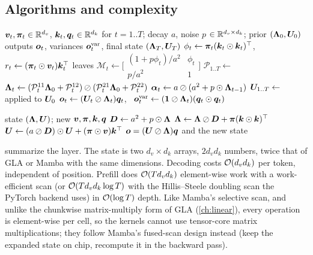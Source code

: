 \subsection{Algorithms and complexity}

\begin{algorithm}[t]
\caption{KLA prefill / training (parallel)}\label{alg:c08-kla-prefill}
\begin{algorithmic}[1]
\Require $\bm{v}_t,\bm{\pi}_t\in\mathbb{R}^{d_v}$, $\bm{k}_t,\bm{q}_t\in\mathbb{R}^{d_k}$ for $t=1..T$; decay $a$, noise $p$
  $\in\mathbb{R}^{d_v\times d_k}$; prior $(\bm{\Lambda}_0,\bm{U}_0)$
\Ensure outputs $\bm{o}_t$, variances $\bm{o}^{\mathrm{var}}_t$, final state $(\bm{\Lambda}_T,\bm{U}_T)$
\State $\phi_t\gets\bm{\pi}_t(\bm{k}_t\odot\bm{k}_t)^{\top}$, \ $r_t\gets(\bm{\pi}_t\odot\bm{v}_t)\bm{k}_t^{\top}$ 
\State leaves $\mathcal{M}_t\gets\bigl[\begin{smallmatrix}(1+p\phi_t)/a^2&\phi_t\\p/a^2&1\end{smallmatrix}\bigr]$
\State $\mathcal{P}_{1..T}\gets$ 
\State $\bm{\Lambda}_t\gets(\mathcal{P}^{11}_t\bm{\Lambda}_0+\mathcal{P}^{12}_t)\oslash(\mathcal{P}^{21}_t\bm{\Lambda}_0+\mathcal{P}^{22}_t)$
\State $\bm{\alpha}_t\gets a\oslash(a^2+p\odot\bm{\Lambda}_{t-1})$ 
\State $\bm{U}_{1..T}\gets$  applied to $\bm{U}_0$
\State $\bm{o}_t\gets(\bm{U}_t\oslash\bm{\Lambda}_t)\bm{q}_t$, \ $\bm{o}^{\mathrm{var}}_t\gets(\bm{1}\oslash\bm{\Lambda}_t)(\bm{q}_t\odot\bm{q}_t)$
\end{algorithmic}
\end{algorithm}

\begin{algorithm}[t]
\caption{KLA decode (one token)}\label{alg:c08-kla-decode}
\begin{algorithmic}[1]
\Require state $(\bm{\Lambda},\bm{U})$; new $\bm{v},\bm{\pi},\bm{k},\bm{q}$
\State $\bm{D}\gets a^2+p\odot\bm{\Lambda}$
\State $\bm{\Lambda}\gets\bm{\Lambda}\oslash\bm{D}+\bm{\pi}(\bm{k}\odot\bm{k})^{\top}$
\State $\bm{U}\gets(a\oslash\bm{D})\odot\bm{U}+(\bm{\pi}\odot\bm{v})\bm{k}^{\top}$
\State \Return $\bm{o}=(\bm{U}\oslash\bm{\Lambda})\bm{q}$ and the new state
\end{algorithmic}
\end{algorithm}

 summarize the layer. The state is two
$d_v\times d_k$ arrays, $2d_vd_k$ numbers, twice that of GLA or Mamba with the same dimensions.
Decoding costs $\mathcal{O}(d_vd_k)$ per token, independent of position. Prefill does $\mathcal{O}(Td_vd_k)$
element-wise work with a work-efficient scan (or $\mathcal{O}(Td_vd_k\log T)$ with the Hillis--Steele
doubling scan the PyTorch backend uses) in $\mathcal{O}(\log T)$ depth. Like Mamba's selective scan, and
unlike the chunkwise matrix-multiply form of GLA (\cref{ch:linear}), every operation is
element-wise per cell, so the kernels cannot use tensor-core matrix multiplications; they follow
Mamba's fused-scan design instead (keep the expanded state on chip, recompute it in the backward
pass).

